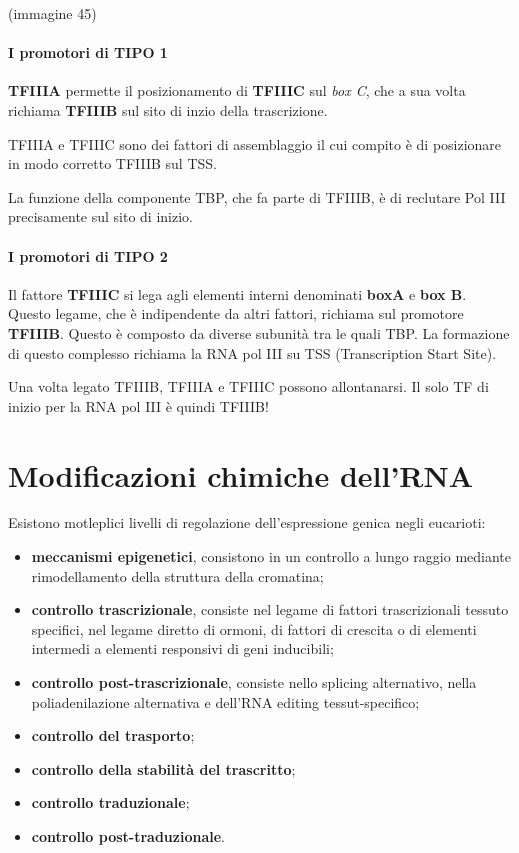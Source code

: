 \documentclass[11pt]{book}
\begin{document}
(immagine 45)

\paragraph{I promotori di TIPO 1}\label{i-promotori-di-tipo-1}

\textbf{TFIIIA} permette il posizionamento di \textbf{TFIIIC} sul
\emph{box C}, che a sua volta richiama \textbf{TFIIIB} sul sito di inzio
della trascrizione.

TFIIIA e TFIIIC sono dei fattori di assemblaggio il cui compito è di
posizionare in modo corretto TFIIIB sul TSS.

La funzione della componente TBP, che fa parte di TFIIIB, è di reclutare
Pol III precisamente sul sito di inizio.

\paragraph{I promotori di TIPO 2}\label{i-promotori-di-tipo-2}

Il fattore \textbf{TFIIIC} si lega agli elementi interni denominati
\textbf{boxA} e \textbf{box B}. Questo legame, che è indipendente da
altri fattori, richiama sul promotore \textbf{TFIIIB}. Questo è composto
da diverse subunità tra le quali TBP. La formazione di questo complesso
richiama la RNA pol III su TSS (Transcription Start Site).

Una volta legato TFIIIB, TFIIIA e TFIIIC possono allontanarsi. Il solo
TF di inizio per la RNA pol III è quindi TFIIIB!

\section{Modificazioni chimiche
dell'RNA}\label{modificazioni-chimiche-dellrna}

Esistono motleplici livelli di regolazione dell'espressione genica negli
eucarioti:

\begin{itemize}
\itemsep1pt\parskip0pt
\item
  \textbf{meccanismi epigenetici}, consistono in un controllo a lungo
  raggio mediante rimodellamento della struttura della cromatina;
\item
  \textbf{controllo trascrizionale}, consiste nel legame di fattori
  trascrizionali tessuto specifici, nel legame diretto di ormoni, di
  fattori di crescita o di elementi intermedi a elementi responsivi di
  geni inducibili;
\item
  \textbf{controllo post-trascrizionale}, consiste nello splicing
  alternativo, nella poliadenilazione alternativa e dell'RNA editing
  tessut-specifico;
\item
  \textbf{controllo del trasporto};
\item
  \textbf{controllo della stabilità del trascritto};
\item
  \textbf{controllo traduzionale};
\item
  \textbf{controllo post-traduzionale}.
\end{itemize}
\end{document}

